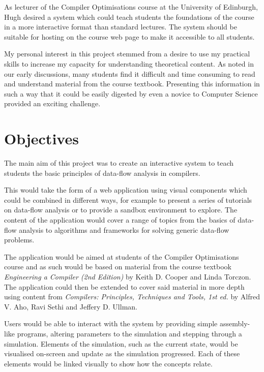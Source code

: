 \documentclass[bsc,twoside,singlespacing,parskip,logo,notimes,normalheadings]{infthesis}
\begin{document}
    As lecturer of the Compiler Optimisations course at the University
    of Edinburgh, Hugh desired a system which could teach students the
    foundations of the course in a more interactive format than
    standard lectures. The system should be suitable for hosting on
    the course web page to make it accessible to all students.
    
    My personal interest in this project stemmed from a desire to use
    my practical skills to increase my capacity for understanding
    theoretical content. As noted in our early discussions, many
    students find it difficult and time consuming to read and
    understand material from the course textbook. Presenting this
    information in such a way that it could be easily digested by even
    a novice to Computer Science provided an exciting challenge.
    
    
    \section{Objectives}
    The main aim of this project was to create an interactive system
    to teach students the basic principles of data-flow analysis in
    compilers.
    
    This would take the form of a web application using visual
    components which could be combined in different ways, for example
    to present a series of tutorials on data-flow analysis or to
    provide a sandbox environment to explore. The content of the
    application would cover a range of topics from the basics of
    data-flow analysis to algorithms and frameworks for solving
    generic data-flow problems.
    
    The application would be aimed at students of the Compiler
    Optimisations course and as such would be based on material from
    the course textbook {\em Engineering a Compiler (2nd Edition)} by
    Keith D. Cooper and Linda Torczon. The application could then be
    extended to cover said material in more depth using content from
    {\em Compilers: Principles, Techniques and Tools, 1st ed.} by
    Alfred V. Aho, Ravi Sethi and Jeffery D. Ullman.
    
    Users would be able to interact with the system by providing
    simple assembly-like programs, altering parameters to the
    simulation and stepping through a simulation. Elements of the
    simulation, such as the current state, would be visualised
    on-screen and update as the simulation progressed. Each of these
    elements would be linked visually to show how the concepts relate.
    
\end{document}
